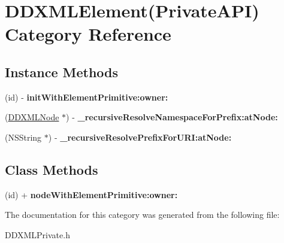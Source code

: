 \hypertarget{category_d_d_x_m_l_element_07_private_a_p_i_08}{}\section{D\+D\+X\+M\+L\+Element(Private\+A\+P\+I) Category Reference}
\label{category_d_d_x_m_l_element_07_private_a_p_i_08}
\subsection*{Instance Methods}
\begin{DoxyCompactItemize}
\item 
\hypertarget{category_d_d_x_m_l_element_07_private_a_p_i_08_abd3c0834b718aa0e99838c7d28d8c42e}{}(id) -\/ {\bfseries init\+With\+Element\+Primitive\+:owner\+:}\label{category_d_d_x_m_l_element_07_private_a_p_i_08_abd3c0834b718aa0e99838c7d28d8c42e}

\item 
\hypertarget{category_d_d_x_m_l_element_07_private_a_p_i_08_aca3c25f8aff56d53947db2deae0b5615}{}(\hyperlink{interface_d_d_x_m_l_node}{D\+D\+X\+M\+L\+Node} $\ast$) -\/ {\bfseries \+\_\+recursive\+Resolve\+Namespace\+For\+Prefix\+:at\+Node\+:}\label{category_d_d_x_m_l_element_07_private_a_p_i_08_aca3c25f8aff56d53947db2deae0b5615}

\item 
\hypertarget{category_d_d_x_m_l_element_07_private_a_p_i_08_a7b1bf34f89e613e29433cdc22b077753}{}(N\+S\+String $\ast$) -\/ {\bfseries \+\_\+recursive\+Resolve\+Prefix\+For\+U\+R\+I\+:at\+Node\+:}\label{category_d_d_x_m_l_element_07_private_a_p_i_08_a7b1bf34f89e613e29433cdc22b077753}

\end{DoxyCompactItemize}
\subsection*{Class Methods}
\begin{DoxyCompactItemize}
\item 
\hypertarget{category_d_d_x_m_l_element_07_private_a_p_i_08_a892baf54010203b96c811ff0a50beedf}{}(id) + {\bfseries node\+With\+Element\+Primitive\+:owner\+:}\label{category_d_d_x_m_l_element_07_private_a_p_i_08_a892baf54010203b96c811ff0a50beedf}

\end{DoxyCompactItemize}


The documentation for this category was generated from the following file\+:\begin{DoxyCompactItemize}
\item 
D\+D\+X\+M\+L\+Private.\+h\end{DoxyCompactItemize}
